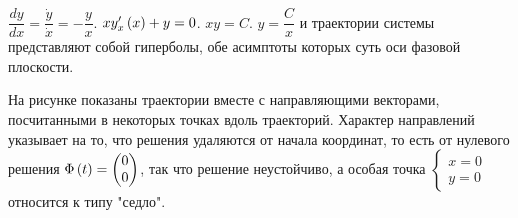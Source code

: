 \documentclass[a5paper,10pt]{article}
\begin{document}
$\dfrac {dy} {dx} = \dfrac {\dot{y}} {\dot{x}} = -\dfrac {y} {x}$.
$x y'_{x}\left(x\right) + y = 0$. 
$xy = C$. $y = \dfrac {C} {x}$ и траектории системы представляют собой гиперболы, обе асимптоты которых суть оси фазовой плоскости.

На рисунке показаны траектории вместе с направляющими векторами, посчитанными в некоторых точках вдоль траекторий. Характер направлений указывает на то, что решения удаляются от начала координат, то есть от нулевого решения $\Phi\left(t\right) = \begin{pmatrix} 0 \\ 0 \end{pmatrix}$, так что решение неустойчиво, а особая точка $\left\{ \begin{matrix} x = 0 \\ y = 0 \end{matrix} \right.$ относится к типу "седло".
\end{document}
